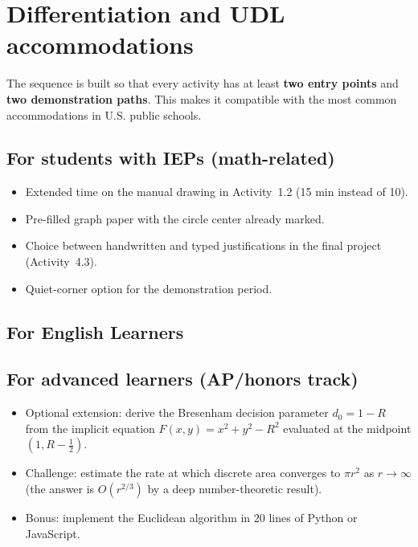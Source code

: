 \documentclass[12pt,letterpaper]{scrartcl}
\newcommand{\acc}[1]{\textcolor{accent}{\textbf{#1}}}
\begin{document}
\section{Differentiation and UDL accommodations}\label{sec:adapt}

The sequence is built so that every activity has at least \acc{two entry points} and \acc{two demonstration paths}. This makes it compatible with the most common accommodations in U.S. public schools.

\subsection{For students with IEPs (math-related)}
\begin{itemize}[leftmargin=1.3em,itemsep=0.15em,topsep=0.3em]
  \item Extended time on the manual drawing in Activity~1.2 (15 min instead of 10).
  \item Pre-filled graph paper with the circle center already marked.
  \item Choice between handwritten and typed justifications in the final project (Activity~4.3).
  \item Quiet-corner option for the demonstration period.
\end{itemize}

\subsection{For English Learners}

\subsection{For advanced learners (AP/honors track)}
\begin{itemize}[leftmargin=1.3em,itemsep=0.15em,topsep=0.3em]
  \item Optional extension: derive the Bresenham decision parameter $d_0 = 1 - R$ from the implicit equation $F(x, y) = x^2 + y^2 - R^2$ evaluated at the midpoint $(1, R - \tfrac{1}{2})$.
  \item Challenge: estimate the rate at which discrete area converges to $\pi r^2$ as $r \to \infty$ (the answer is $O(r^{2/3})$ by a deep number-theoretic result).
  \item Bonus: implement the Euclidean algorithm in 20 lines of Python or JavaScript.
\end{itemize}
\end{document}
